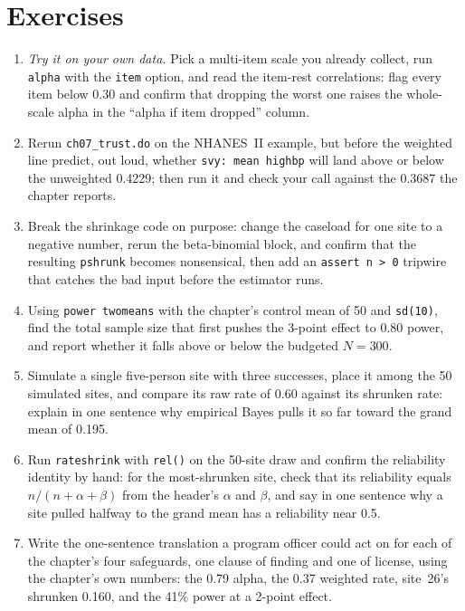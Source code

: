 \documentclass[
    a4paper,
    fontsize=10pt,
    twoside=true,
    numbers=noenddot,
]{kaobook}
\begin{document}
\section*{Exercises}
\begin{enumerate}
  \item \emph{Try it on your own data.} Pick a multi-item scale you already collect, run \texttt{alpha} with the \texttt{item} option, and read the item-rest correlations: flag every item below 0.30 and confirm that dropping the worst one raises the whole-scale alpha in the \enquote{alpha if item dropped} column.
  \item Rerun \texttt{ch07\_trust.do} on the NHANES~II example, but before the weighted line predict, out loud, whether \texttt{svy: mean highbp} will land above or below the unweighted 0.4229; then run it and check your call against the 0.3687 the chapter reports.
  \item Break the shrinkage code on purpose: change the caseload for one site to a negative number, rerun the beta-binomial block, and confirm that the resulting \texttt{pshrunk} becomes nonsensical, then add an \texttt{assert n > 0} tripwire that catches the bad input before the estimator runs.
  \item Using \texttt{power twomeans} with the chapter's control mean of 50 and \texttt{sd(10)}, find the total sample size that first pushes the 3-point effect to 0.80 power, and report whether it falls above or below the budgeted $N=300$.
  \item Simulate a single five-person site with three successes, place it among the 50 simulated sites, and compare its raw rate of 0.60 against its shrunken rate: explain in one sentence why empirical Bayes pulls it so far toward the grand mean of 0.195.
  \item Run \texttt{rateshrink} with \texttt{rel()} on the 50-site draw and confirm the reliability identity by hand: for the most-shrunken site, check that its reliability equals $n/(n+\alpha+\beta)$ from the header's $\alpha$ and $\beta$, and say in one sentence why a site pulled halfway to the grand mean has a reliability near 0.5.
  \item Write the one-sentence translation a program officer could act on for each of the chapter's four safeguards, one clause of finding and one of license, using the chapter's own numbers: the 0.79 alpha, the 0.37 weighted rate, site~26's shrunken 0.160, and the 41\% power at a 2-point effect.
\end{enumerate}
\end{document}
